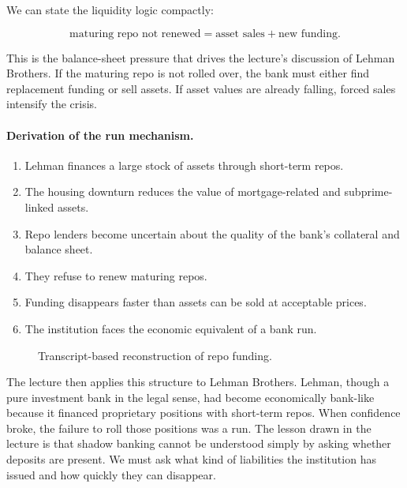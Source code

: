 We can state the liquidity logic compactly:

\begin{equation}
\text{maturing repo not renewed}=\text{asset sales}+\text{new funding}.
\end{equation}

This is the balance-sheet pressure that drives the lecture's discussion of Lehman Brothers. If the maturing repo is not rolled over, the bank must either find replacement funding or sell assets. If asset values are already falling, forced sales intensify the crisis.

\paragraph{Derivation of the run mechanism.}
\begin{enumerate}
\item Lehman finances a large stock of assets through short-term repos.
\item The housing downturn reduces the value of mortgage-related and subprime-linked assets.
\item Repo lenders become uncertain about the quality of the bank's collateral and balance sheet.
\item They refuse to renew maturing repos.
\item Funding disappears faster than assets can be sold at acceptable prices.
\item The institution faces the economic equivalent of a bank run.
\end{enumerate}

\begin{figure}
\centering
{}
\caption{Transcript-based reconstruction of repo funding.}
\end{figure}

The lecture then applies this structure to Lehman Brothers. Lehman, though a pure investment bank in the legal sense, had become economically bank-like because it financed proprietary positions with short-term repos. When confidence broke, the failure to roll those positions was a run. The lesson drawn in the lecture is that shadow banking cannot be understood simply by asking whether deposits are present. We must ask what kind of liabilities the institution has issued and how quickly they can disappear.

